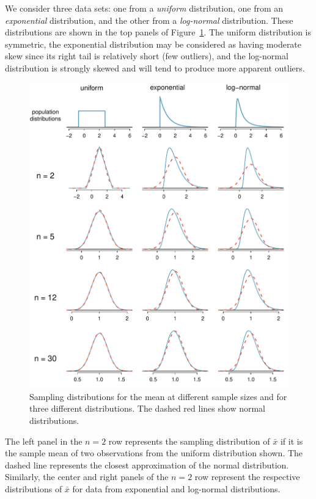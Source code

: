 We consider three data sets: one from a \emph{uniform} distribution, one from an \emph{exponential} distribution, and the other from a \emph{log-normal} distribution. These distributions are shown in the top panels of Figure~\ref{cltSimulations}. The uniform distribution is symmetric, the exponential distribution may be considered as having moderate skew since its right tail is relatively short (few outliers), and the log-normal distribution is strongly skewed and will tend to produce more apparent outliers.

\begin{figure}
   \centering
   \includegraphics[width=\textwidth]{ch_inference_foundations/figures/cltSimulations/cltSimulations}
   \caption{Sampling distributions for the mean at different sample sizes and for three different distributions. The dashed red lines show normal distributions.}
   \label{cltSimulations}
\end{figure}

The left panel in the $n=2$ row represents the sampling distribution of $\bar{x}$ if it is the sample mean of two observations from the uniform distribution shown. The dashed line represents the closest approximation of the normal distribution. Similarly, the center and right panels of the $n=2$ row represent the respective distributions of $\bar{x}$ for data from exponential and log-normal distributions.

